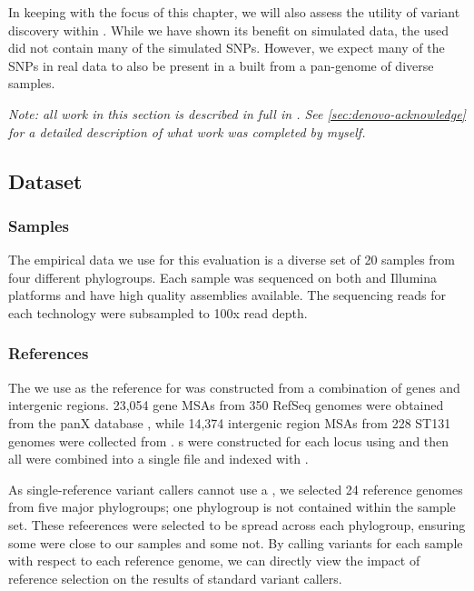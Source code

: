 In keeping with the focus of this chapter, we will also assess the utility of \denovo{} variant discovery within \pandora{}. While we have shown its benefit on simulated data, the \panrg{} used did not contain many of the simulated SNPs. However, we expect many of the SNPs in real data to also be present in a \panrg{} built from a pan-genome of diverse samples. 

\textit{Note: all work in this section is described in full in \cite{pandora}. See \autoref{sec:denovo-acknowledge} for a detailed description of what work was completed by myself.}

\subsection{Dataset}
\label{sec:denovo-empirical-data}

\subsubsection{Samples}
The empirical data we use for this evaluation is a diverse set of 20 \ecoli{} samples from four different phylogroups. Each sample was sequenced on both \ont{} and Illumina platforms and have high quality assemblies available. The sequencing reads for each technology were subsampled to 100x read depth.

\subsubsection{References}
The \panrg{} we use as the reference for \pandora{} was constructed from a combination of \ecoli{} genes and intergenic regions. 23,054 gene MSAs from 350 RefSeq genomes were obtained from the panX database \cite{panx}, while 14,374 intergenic region MSAs from 228 ST131 genomes were collected from \cite{thorpe2018}. \prg{}s were constructed for each locus using \makeprg{} and then all were combined into a single \panrg{} file and indexed with \pandora{}.

As single-reference variant callers cannot use a \panrg{}, we selected 24 reference genomes from five major phylogroups; one phylogroup is not contained within the sample set. These refeerences were selected to be spread across each phylogroup, ensuring some were close to our samples and some not. By calling variants for each sample with respect to each reference genome, we can directly view the impact of reference selection on the results of standard variant callers.

